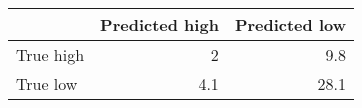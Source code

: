 \begin{tabular}{lrr}
\hline
           &   Predicted high &   Predicted low \\
\hline
 True high &              2   &             9.8 \\
 True low  &              4.1 &            28.1 \\
\hline
\end{tabular}